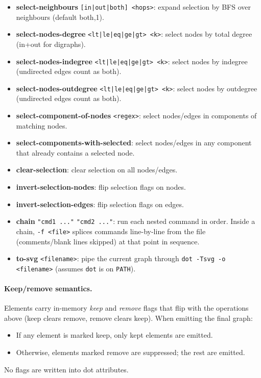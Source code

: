 \documentclass[11pt]{article}
\begin{document}
\begin{itemize}[leftmargin=*]
  \item \textbf{select-neighbours} \texttt{[in|out|both] <hops>}: expand selection by BFS over neighbours (default both,1).
  \item \textbf{select-nodes-degree} \texttt{<lt|le|eq|ge|gt> <k>}: select nodes by total degree (in+out for digraphs).
  \item \textbf{select-nodes-indegree} \texttt{<lt|le|eq|ge|gt> <k>}: select nodes by indegree (undirected edges count as both).
  \item \textbf{select-nodes-outdegree} \texttt{<lt|le|eq|ge|gt> <k>}: select nodes by outdegree (undirected edges count as both).
  \item \textbf{select-component-of-nodes} \texttt{<regex>}: select nodes/edges in components of matching nodes.
  \item \textbf{select-components-with-selected}: select nodes/edges in any component that already contains a selected node.
  \item \textbf{clear-selection}: clear selection on all nodes/edges.
  \item \textbf{invert-selection-nodes}: flip selection flags on nodes.
  \item \textbf{invert-selection-edges}: flip selection flags on edges.
  \item \textbf{chain} \texttt{"cmd1 ..."} \texttt{"cmd2 ..."}: run each nested command in order. Inside a chain, \texttt{-f <file>} splices commands line-by-line from the file (comments/blank lines skipped) at that point in sequence.
  \item \textbf{to-svg} \texttt{<filename>}: pipe the current graph through \texttt{dot -Tsvg -o <filename>} (assumes \texttt{dot} is on \texttt{PATH}).
\end{itemize}

\paragraph{Keep/remove semantics.}
Elements carry in-memory \emph{keep} and \emph{remove} flags that flip with the operations above (keep clears remove, remove clears keep). When emitting the final graph:
\begin{itemize}[leftmargin=*]
  \item If any element is marked keep, only kept elements are emitted.
  \item Otherwise, elements marked remove are suppressed; the rest are emitted.
\end{itemize}
No flags are written into dot attributes.
\end{document}
